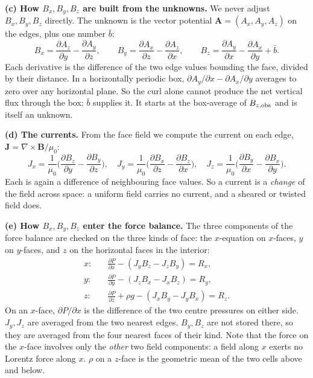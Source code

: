 \documentclass[10pt]{extarticle}
\newcommand{\B}{\mathbf B}\newcommand{\J}{\mathbf J}\newcommand{\Bo}{\mathbf B_{\rm obs}}
\begin{document}
\textbf{(c) How $B_x,B_y,B_z$ are built from the unknowns.} We never adjust $B_x,B_y,B_z$ directly. The unknown is the vector potential $\mathbf A=(A_x,A_y,A_z)$ on the edges, plus one number $\bar b$:
\[
B_x=\frac{\partial A_z}{\partial y}-\frac{\partial A_y}{\partial z},\qquad
B_y=\frac{\partial A_x}{\partial z}-\frac{\partial A_z}{\partial x},\qquad
B_z=\frac{\partial A_y}{\partial x}-\frac{\partial A_x}{\partial y}+\bar b .
\]
Each derivative is the difference of the two edge values bounding the face, divided by their distance. In a horizontally periodic box, $\partial A_y/\partial x-\partial A_x/\partial y$ averages to zero over any horizontal plane. So the curl alone cannot produce the net vertical flux through the box; $\bar b$ supplies it. It starts at the box-average of $B_{z,{\rm obs}}$ and is itself an unknown.

\textbf{(d) The currents.} From the face field we compute the current on each edge, $\J=\nabla\times\B/\mu_0$:
\[
J_x=\frac1{\mu_0}\Big(\frac{\partial B_z}{\partial y}-\frac{\partial B_y}{\partial z}\Big),\quad
J_y=\frac1{\mu_0}\Big(\frac{\partial B_x}{\partial z}-\frac{\partial B_z}{\partial x}\Big),\quad
J_z=\frac1{\mu_0}\Big(\frac{\partial B_y}{\partial x}-\frac{\partial B_x}{\partial y}\Big).
\]
Each is again a difference of neighbouring face values. So a current is a \emph{change} of the field across space: a uniform field carries no current, and a sheared or twisted field does.

\textbf{(e) How $B_x,B_y,B_z$ enter the force balance.} The three components of the force balance are checked on the three kinds of face: the $x$-equation on $x$-faces, $y$ on $y$-faces, and $z$ on the horizontal faces in the interior:
\[
\begin{aligned}
x:&\quad \frac{\partial P}{\partial x}-(J_yB_z-J_zB_y)=R_x,\\
y:&\quad \frac{\partial P}{\partial y}-(J_zB_x-J_xB_z)=R_y,\\
z:&\quad \frac{\partial P}{\partial z}+\rho g-(J_xB_y-J_yB_x)=R_z .
\end{aligned}
\]
On an $x$-face, $\partial P/\partial x$ is the difference of the two centre pressures on either side. $J_y,J_z$ are averaged from the two nearest edges. $B_y,B_z$ are not stored there, so they are averaged from the four nearest faces of their kind. Note that the force on the $x$-face involves only the \emph{other} two field components: a field along $x$ exerts no Lorentz force along $x$. $\rho$ on a $z$-face is the geometric mean of the two cells above and below.
\end{document}
